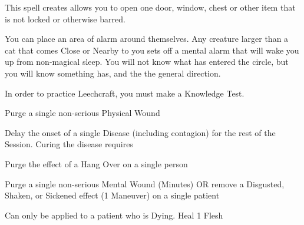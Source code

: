 {  

  This spell creates allows you to open one door, window, chest or other item that is not locked or otherwise barred. 


  You can place an area of alarm around themselves.  Any creature larger than a cat that comes Close or Nearby to you sets off a mental alarm that will wake you up from non-magical sleep.  You will not know what has entered the circle, but you will know something has, and the the general direction.



    \newpage


    In order to practice Leechcraft, you must make a Knowledge Test. 

  
  \LEECHCRAFT[
    Name=Bonesetting,
    Link=leechcraft-bonesetting,
    Mod=+3,
    Length=Hours,
    Keywords=Purge
  ]

  Purge a single non-serious Physical Wound

  \LEECHCRAFT[
    Name=Delay Infection,
    Link=leechcraft-delay-infection,
    Mod=+3,
    Length=2 Maneuvers,
    Keywords=None 
  ]
  
  Delay the onset of a single Disease (including contagion) for the rest of the Session.  Curing the disease requires 


  \LEECHCRAFT[
    Name=Hair of the Dog,
    Link=leechcraft-hair-of-the-dog,
    Mod=+9,
    Length=Minutes,
    Keywords=Purge 
  ]
  Purge the effect of a Hang Over on a single person

  \LEECHCRAFT[
    Name=Laudanum,
    Link=leechcraft-laudanum,
    Mod=+0,
    Length=see below,
    Keywords=Purge 
  ]
  Purge a single non-serious Mental Wound (Minutes) OR remove a Disgusted, Shaken, or Sickened effect (1 Maneuver) on a single patient

  \LEECHCRAFT[
    Name=Mend,
    Link=leechcraft-mend,
    Mod=+9,
    Length=1 Maneuver,
    Keywords=None 
  ]
  Can only be applied to a patient who is Dying. Heal 1 Flesh

}
